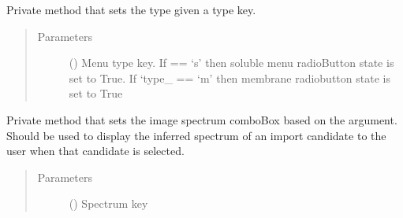 \documentclass[letterpaper,10pt,english]{sphinxmanual}
\begin{document}
\begin{fulllineitems}
\begin{fulllineitems}
\end{fulllineitems}


\begin{fulllineitems}
\label{\detokenize{polo.windows:polo.windows.run_importer.RunImporterDialog._set_cocktail_menu_type_radiobuttons}}
Private method that sets the {\hyperref[\detokenize{polo.utils:polo.utils.io_utils.Menu}]{}} 
type 
given a {\hyperref[\detokenize{polo.utils:polo.utils.io_utils.Menu}]{}} type key.
\begin{quote}\begin{description}
\item[{Parameters}] \leavevmode
{} () \textendash{} Menu type key. If  == ‘s’ then soluble
menu radioButton state is set to True. If ‘type\_\textasciigrave{} == ‘m’ then
membrane radiobutton state is set to True

\end{description}\end{quote}

\end{fulllineitems}


\begin{fulllineitems}
\label{\detokenize{polo.windows:polo.windows.run_importer.RunImporterDialog._set_image_spectrum}}
Private method that sets the image spectrum comboBox
based on the  argument. Should be used to display
the inferred spectrum of an import candidate to the user when
that candidate is selected.
\begin{quote}\begin{description}
\item[{Parameters}] \leavevmode
{} () \textendash{} Spectrum key


\end{description}
\end{quote}
\end{fulllineitems}
\end{fulllineitems}
\end{document}
